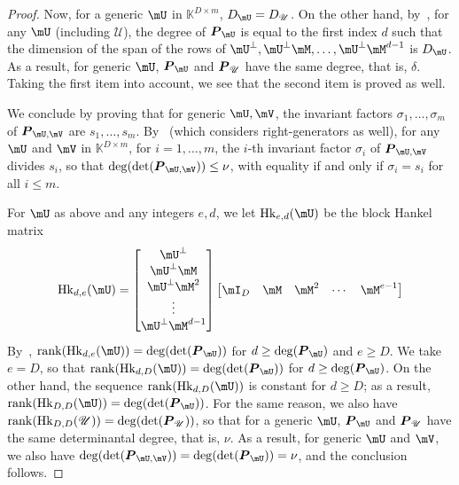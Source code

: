 \documentclass[12pt]{article}
\newcommand{\mat}[1]{\bm{\MakeUppercase{#1}}} %
\def\K{\mathbb{K}}
\def\K {\ensuremath{\mathbb{K}}}
\def\scrU {\ensuremath{\mathscr{U}}}
\def\scrV {\ensuremath{\mathscr{V}}}
\begin{document}
\begin{proof}
  Now, for a generic $\mU$ in $\K^{D\times m}$, $D_\mU=D_\scrU$. On
  the other hand, by~\cite[Lemma~4.3]{Villard97a}, for any $\mU$
  (including $\scrU$), the degree of $\mat{P}_{\mU}$ is equal to the
  first index $d$ such that the dimension of the span of the rows of
  $\mU^\perp,\mU^\perp \mM,\dots, \mU^\perp \mM^{d-1}$ is $D_\mU$. As
  a result, for generic $\mU$, $\mat{P}_{\mU}$ and $\mat{P}_{\scrU}$
  have the same degree, that is, $\delta$.  Taking the first item into
  account, we see that the second item is proved as well.
	
  We conclude by proving that for generic $\mU,\mV$, the invariant
  factors $\sigma_1,\dots,\sigma_m$ of $\mat{P}_{\mU,\mV}$ are
  $s_1,\dots,s_m$.  By~\cite[Theorem~2.12]{KaVi04} (which considers 
  right-generators as well), for any $\mU$ and
  $\mV$ in $\K^{D\times m}$, for $i=1,\dots,m$, the $i$-th invariant
  factor $\sigma_i$ of $\mat{P}_{\mU,\mV}$ divides $s_i$, so that
  $\deg(\det(\mat{P}_{\mU,\mV}))\le\nu$, with equality if and only
  if $\sigma_i=s_i$ for all $i \le m$.
	
  For $\mU$ as above and any integers $e,d$, we let ${\rm
    Hk}_{e,d}(\mU)$ be the block Hankel matrix
  $$ {\rm Hk}_{d,e}(\mU) =
  \begin{bmatrix}
    \mU^\perp \\     \mU^\perp \mM \\     \mU^\perp \mM^2 \\ \vdots  \\      \mU^\perp\mM^{d-1}
  \end{bmatrix}
  \begin{bmatrix}
    \mI_D & \mM & \mM^2 &\cdots& \mM^{e-1}
  \end{bmatrix}
  $$ By~\cite[Eq.~(2.6)]{KaVi04}, ${\rm rank}({\rm Hk}_{d,e}(\mU)) =
  \deg(\det(\mat{P}_{\mU}))$ for $d \ge \deg(\mat{P}_{\mU})$
  and $e \ge D$.  We take $e=D$, so that ${\rm rank}({\rm
    Hk}_{d,D}(\mU)) = \deg(\det(\mat{P}_{\mU}))$ for $d \ge
  \deg(\mat{P}_{\mU})$. On the other hand, the sequence ${\rm
    rank}({\rm Hk}_{d,D}(\mU))$ is constant for $d \ge D$; as a
  result, ${\rm rank}({\rm Hk}_{D,D}(\mU)) =
  \deg(\det(\mat{P}_{\mU}))$. For the same reason, we also have ${\rm
    rank}({\rm Hk}_{D,D}(\scrU)) = \deg(\det(\mat{P}_{\scrU}))$, so that
  for a generic $\mU$, $\mat{P}_{\mU}$ and $\mat{P}_{\scrU}$
  have the same determinantal degree, that is, $\nu$.  As a result,
  for generic $\mU$ and $\mV$, we also have
  $\deg(\det(\mat{P}_{\mU,\mV}))=\deg(\det(\mat{P}_{\mU}))=\nu$, and the conclusion follows.
\end{proof} 
\end{document}
